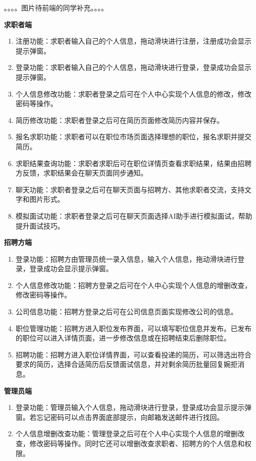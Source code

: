 \documentclass[UTF8,a4paper,10pt]{ctexart}
\begin{document}
。。。。图片待前端的同学补充。。。。

\textbf{求职者端}
\begin{enumerate}
    \item 注册功能：求职者输入自己的个人信息，拖动滑块进行注册，注册成功会显示提示弹窗。
    \item 登录功能：求职者输入自己的个人信息，拖动滑块进行登录，登录成功会显示提示弹窗。
    \item 个人信息修改功能：求职者登录之后可在个人中心实现个人信息的修改，修改密码等操作。
    \item 简历修改功能：求职者登录之后可在简历页面修改简历内容并保存。
    \item 报名求职功能：求职者可以在职位市场页面选择理想的职位，报名求职并提交简历。
    \item 求职结果查询功能：求职者求职后可在职位详情页查看求职结果，结果由招聘方反馈，求职结果会在聊天页面同步通知。
    \item 聊天功能：求职者登录之后可在聊天页面与招聘方、其他求职者交流，支持文字和图片形式。
    \item 模拟面试功能：求职者登录之后可在聊天页面选择AI助手进行模拟面试，帮助提升面试技巧。
\end{enumerate}

\textbf{招聘方端}
\begin{enumerate}
    \item 登录功能：招聘方由管理员统一录入信息，输入个人信息，拖动滑块进行登录，登录成功会显示提示弹窗。
    \item 个人信息修改功能：招聘方登录之后可在个人中心实现个人信息的增删改查，修改密码等操作。
    \item 公司信息功能：招聘方登录之后可在公司信息页面实现修改公司的信息。
    \item 职位管理功能：招聘方进入职位发布界面，可以填写职位信息并发布。已发布的职位可以进入详情页面，进一步修改信息或在招聘结束后删除职位。
    \item 招聘功能：招聘方进入职位详情界面，可以查看投递的简历，可以筛选出符合要求的简历，选择合适简历后反馈面试信息，并对剩余简历批量回复婉拒消息。    
\end{enumerate}

\textbf{管理员端}
\begin{enumerate}
    \item 登录功能：管理员输入个人信息，拖动滑块进行登录，登录成功会显示提示弹窗。若忘记密码可以点击界面底部提示，向邮箱发送邮件进行找回。
    \item 个人信息增删改查功能：管理登录之后可在个人中心实现个人信息的增删改查，修改密码等操作。同时它还可以增删改查求职者、招聘方的个人信息和权限。
\end{enumerate}
\end{document}
